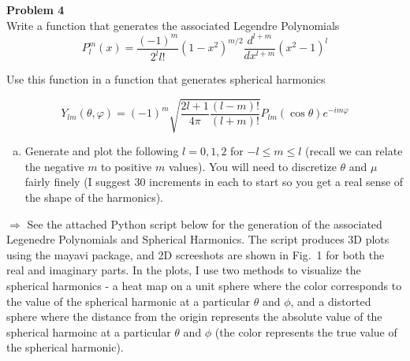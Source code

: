 \documentclass[10pt]{article}
\begin{document}
\newpage
\noindent \textbf{Problem 4}\\
Write a function that generates the associated Legendre Polynomials
%
\begin{equation*}
    P_l^m(x) = \frac{(-1)^m}{2^l l!}(1-x^2)^{m/2}\frac{d^{l+m}}{dx^{l+m}}(x^2-1)^l
\end{equation*}

Use this function in a function that generates spherical harmonics

\begin{equation*}
    Y_{lm}(\theta,\varphi)=(-1)^m\sqrt{\frac{2l+1}{4\pi}\frac{(l-m)!}{(l+m)!}}P_{lm}(\cos\theta)e^{-im\varphi}
\end{equation*}

\begin{enumerate}[(a)]
    \item Generate and plot the following $l = 0, 1, 2$ for $−l \leq m \leq l$ (recall we can relate the negative $m$ to positive $m$ values). You will need to discretize $\theta$ and $\mu$ fairly finely (I suggest 30 increments in each to start so you get a real sense of the shape of the harmonics). \\[-5pt]
\end{enumerate}

$\Rightarrow$ See the attached Python script below for the generation of the associated Legenedre Polynomials and Spherical Harmonics. The script produces 3D plots using the mayavi package, and 2D screeshots are shown in Fig.~1 for both the real and imaginary parts. In the plots, I use two methods to visualize the spherical harmonics - a heat map on a unit sphere where the color corresponds to the value of the spherical harmonic at a particular $\theta$ and $\phi$, and a distorted sphere where the distance from the origin represents the absolute value of the spherical harmoinc at a particular $\theta$ and $\phi$ (the color represents the true value of the spherical harmonic). \\


\end{document}
